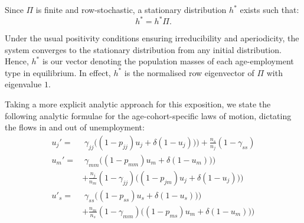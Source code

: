 \documentclass{article}
\begin{document}
Since $\Pi$ is finite and row-stochastic, a stationary distribution $h^*$ exists such that:
\[
h^*=h^*\Pi.
\]

Under the usual positivity conditions ensuring irreducibility and aperiodicity, the system converges to the stationary distribution from any initial distribution. Hence, $h^*$ is our vector denoting the population masses of each age-employment type in equilibrium. In effect, $h^*$ is the normalised row eigenvector of $\Pi$ with eigenvalue $1$.

Taking a more explicit analytic approach for this exposition, we state the following analytic formulae for the age-cohort-specific laws of motion, dictating the flows in and out of unemployment:
\begin{align*}
u_j'=&\;\gamma_{jj}\bigl((1-p_{jj})u_j+\delta(1-u_j))\bigr) + \frac{n_s}{n_j}(1-\gamma_{ss})\\
u_m'=&\;\gamma_{mm}\bigl((1-p_{mm})u_m+\delta(1-u_m))\bigr)\\
&+\frac{n_j}{n_m}(1-\gamma_{jj})\bigl((1-p_{jm})u_j+\delta(1-u_j))\bigr)\\
u'_s=&\;\gamma_{ss}\bigl((1-p_{ss})u_s+\delta(1-u_s))\bigr)\\
&+\frac{n_m}{n_s}(1-\gamma_{mm})\bigl((1-p_{ms})u_m+\delta(1-u_m))\bigr)
\end{align*}
\end{document}

